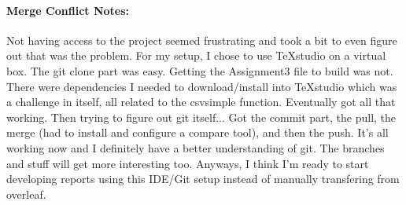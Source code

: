 	\paragraph*{\textbf{Merge Conflict Notes:}}
	
	
	Not having access to the project seemed frustrating and took a bit to even figure out that was the problem. For my setup, I chose to use TeXstudio on a virtual box. The git clone part was easy. Getting the Assignment3 file to build was not. There were dependencies I needed to download/install into TeXstudio which was a challenge in itself, all related to the csvsimple function. Eventually got all that working. Then trying to figure out git itself... Got the commit part, the pull, the merge (had to install and configure a compare tool), and then the push. It's all working now and I definitely have a better understanding of git. The branches and stuff will get more interesting too. Anyways, I think I'm ready to start developing reports using this IDE/Git setup instead of manually transfering from overleaf.
		
	
%

 
